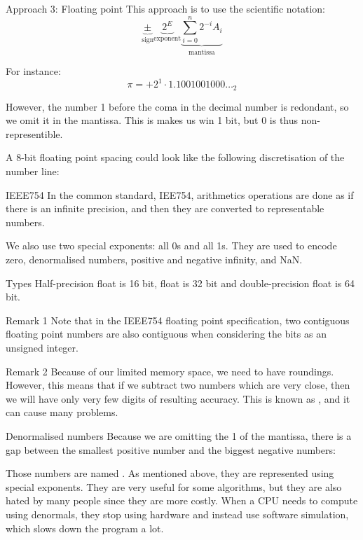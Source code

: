 \documentclass[a4paper]{article}
\begin{document}
\begin{parag}{Approach 3: Floating point}
    This approach is to use the scientific notation: 
    \[\underbrace{\pm}_{\text{sign}} \underbrace{2^E}_{\text{exponent}} \underbrace{\sum_{i=0}^{n} 2^{-i} A_i}_{\text{mantissa}}\]
    
    For instance: 
    \[\pi = +2^{1} \cdot  1.1001001000\ldots_2\]
    
    However, the number 1 before the coma in the decimal number is redondant, so we omit it in the mantissa. This is makes us win 1 bit, but 0 is thus non-representible.

    A 8-bit floating point spacing could look like the following discretisation of the number line:
\end{parag}

\begin{parag}{IEEE754}
    In the common standard, IEE754, arithmetics operations are done as if there is an infinite precision, and then they are converted to representable numbers.

    We also use two special exponents: all 0s and all 1s. They are used to encode zero, denormalised numbers, positive and negative infinity, and NaN.

    \begin{subparag}{Types}
        Half-precision float is 16 bit, float is 32 bit and double-precision float is 64 bit.
    \end{subparag}

    \begin{subparag}{Remark 1}
        Note that in the IEEE754 floating point specification, two contiguous floating point numbers are also contiguous when considering the bits as an unsigned integer.
    \end{subparag}
    
    \begin{subparag}{Remark 2}
        Because of our limited memory space, we need to have roundings. However, this means that if we subtract two numbers which are very close, then we will have only very few digits of resulting accuracy. This is known as , and it can cause many problems.
    \end{subparag}
\end{parag}

\begin{parag}{Denormalised numbers}
    Because we are omitting the 1 of the mantissa, there is a gap between the smallest positive number and the biggest negative numbers:

    Those numbers are named . As mentioned above, they are represented using special exponents. They are very useful for some algorithms, but they are also hated by many people since they are more costly. When a CPU needs to compute using denormals, they stop using hardware and instead use software simulation, which slows down the program a lot.
\end{parag}
\end{document}
